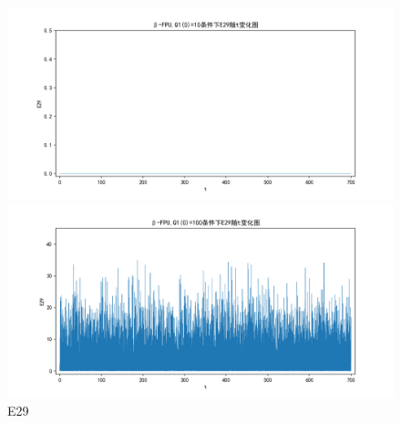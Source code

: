 \documentclass[10pt, a4paper]{article}
\begin{document}
    \begin{figure}[H]
        \begin{minipage}[t]{0.49\textwidth}
            \centering
            \includegraphics[width=\textwidth]{./q6_pics/cmp/E29.png}
        \end{minipage}
        \begin{minipage}[t]{0.49\textwidth}
            \centering
            \includegraphics[width=\textwidth]{./q6_pics/exp/E29.png}
        \end{minipage}
        \caption{E29}\label{fig:E29 in q6}
    \end{figure}
\end{document}
